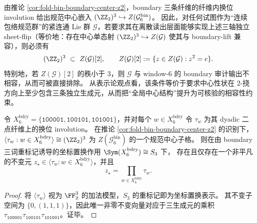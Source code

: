 \begin{remark}\label{rem:bdry-center-z2-global-compatibility}
由推论 \ref{cor:fold-bin-boundary-center-z2}，boundary 三条纤维的纤维内换位 involution 给出规范中心嵌入
\(
(\ZZ_2)^3\hookrightarrow Z(\mathcal{G}^{\mathrm{bin}}_6)
\)。
因此，对任何试图作为“连续包络规范群”的紧连通 Lie 群 \(\mathcal G\)，若要求其在离散读出层面能够实现上述三轴独立 sheet-flip（等价地：存在中心单态射 \((\ZZ_2)^3\hookrightarrow Z(\mathcal G)\) 使其与 boundary-lift 兼容），则必须有
\[
(\ZZ_2)^3\ \subset\ Z(\mathcal G)[2],
\qquad
Z(\mathcal G)[2]:=\{z\in Z(\mathcal G):z^2=e\}.
\]
特别地，若 \(Z(\mathcal G)[2]\) 的秩小于 \(3\)，则 \(\mathcal G\) 与 window-\(6\) 的 boundary 审计输出不相容，从而可被直接排除。
从表示论观点看，该条件等价于要求中心性状在 \(2\)-挠方向上至少包含三条独立生成元，从而把“全局中心结构”提升为可核验的相容性约束。
\end{remark}

\begin{proposition}\label{prop:bdry-three-axis-unique-symmetric-central-invariant}
令 \(X^{\mathrm{bdry}}_6=\{\texttt{100001},\texttt{100101},\texttt{101001}\}\)，并对每个 \(w\in X^{\mathrm{bdry}}_6\) 令 \(\tau_w\) 为其 dyadic 二点纤维上的换位 involution。
在推论 \ref{cor:fold-bin-boundary-center-z2} 的识别下，\(\langle \tau_w:w\in X^{\mathrm{bdry}}_6\rangle\cong (\ZZ_2)^3\) 为 \(Z(\mathcal{G}^{\mathrm{bin}}_6)\) 的一个规范中心子格。
则在由 boundary 三词重标记诱导的坐标置换作用 \(\Sym(X^{\mathrm{bdry}}_6)\cong S_3\) 下，
存在且仅存在一个非平凡的不变元 \(z_\star\in \langle \tau_w:w\in X^{\mathrm{bdry}}_6\rangle\)，并且
\[
z_\star=\prod_{w\in X^{\mathrm{bdry}}_6}\tau_w.
\]
\end{proposition}
\begin{proof}
将 \(\langle \tau_w\rangle\) 视为 \(\FF_2^3\) 的加法模型，\(S_3\) 的重标记即为坐标置换表示。
其不变子空间为 \(\{0,(1,1,1)\}\)，因此唯一非零不变向量对应于三生成元的乘积 \(\tau_{\texttt{100001}}\tau_{\texttt{100101}}\tau_{\texttt{101001}}\)。证毕。
\end{proof}

